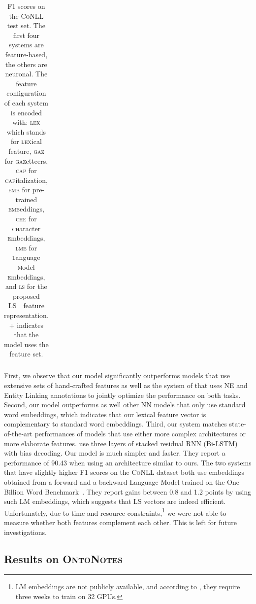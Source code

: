 \documentclass[11pt]{article}
\newcommand{\conll}{\textsc{CoNLL}}
\newcommand{\onto}{\textsc{OntoNotes}}
\newcommand{\lr}{\textsc{LS}}
\newcommand{\lll}{\textsc{lex}}
\newcommand{\ggg}{\textsc{gaz}}
\newcommand{\ccc}{\textsc{cap}}
\newcommand{\chhh}{\textsc{che}}
\newcommand{\eee}{\textsc{emb}}
\newcommand{\sss}{\textsc{ls}}
\begin{document}
\begin{table}[!h]
\begin{center}
\begin{tabular}{|l|lllllll|c|}
				
			\end{tabular}
		\end{center}
		
		
		\caption{F1 scores on the \conll{} test set. The first four systems are feature-based, the others are neuronal. The   feature configuration of each system is encoded with:  \lll{} which stands for \textsc{lex}ical feature, \ggg{} for \textsc{gaz}etteers, \ccc{} for \textsc{cap}italization, \eee{} for pre-trained \textsc{emb}eddings, \chhh{} for \textsc{ch}aracter \textsc{e}mbeddings, \textsc{lme} for \textsc{l}anguage \textsc{m}odel \textsc{e}mbeddings, and  \sss{} for the proposed \lr{~} feature representation. \textsc{+} indicates that the model uses the feature set.}
		
		\label{tab:conll.res} 
		
	\end{table}
		
	First, we observe that our model significantly  outperforms models that use extensive sets of hand-crafted features \cite{ratinov2009design,lin2009phrase} as well as the system of \cite{luo-2015} that uses NE and Entity Linking annotations to jointly optimize the performance on both tasks.  Second, our model outperforms as well other NN models that only use standard word embeddings, which indicates that our lexical feature vector is complementary to standard word embeddings. 
	Third, our system matches state-of-the-art performances of models that use either more complex architectures or more elaborate features.  use three layers of stacked residual RNN (Bi-LSTM) with bias decoding. Our model is much simpler and faster. They report a performance of 90.43 when using an architecture similar to ours. The two systems that have slightly higher F1 scores on the \conll{} dataset both use embeddings obtained from a forward and a backward Language Model trained on the One Billion Word Benchmark~\cite{chelba2013one}. They report gains between 0.8 and 1.2 points by using such LM embeddings, which suggests that \lr{} vectors are indeed efficient. Unfortunately, due to time and resource constraints,\footnote{LM embeddings are not publicly available, and according to , they require three weeks to train on 32 GPUs.} we were not able to measure whether both features complement each other. This is left for future investigations. 
	
	\subsection{Results on \onto}	
	
\end{document}
